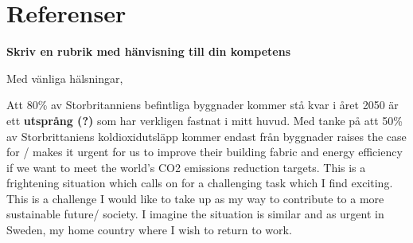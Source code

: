\documentclass[11pt,a4paper,sans]{moderncv}        %
\begin{document}
\section{Referenser}


%


\clearpage
\date{\today}
\opening{\textbf{Skriv en rubrik med h{\"a}nvisning till din kompetens}}
\closing{Med v{\"a}nliga h{\"a}lsningar,}
\makelettertitle

Att 80\% av Storbritanniens befintliga byggnader kommer st{\aa} kvar i {\aa}ret 2050 {\"a}r ett \textbf{utspr{\aa}ng (?)} som har verkligen fastnat i mitt huvud.
Med tanke p{\aa} att 50\% av Storbrittaniens koldioxidutsl{\"a}pp kommer endast fr{\aa}n byggnader raises the case for / makes it urgent for us to improve their building fabric and energy efficiency if we want to meet the world's CO2 emissions reduction targets.
This is a frightening situation which calls on for a challenging task which I find exciting.
This is a challenge I would like to take up as my way to contribute to a more sustainable future/ society.
I imagine the situation is similar and as urgent in Sweden, my home country where I wish to return to work.
\end{document}
